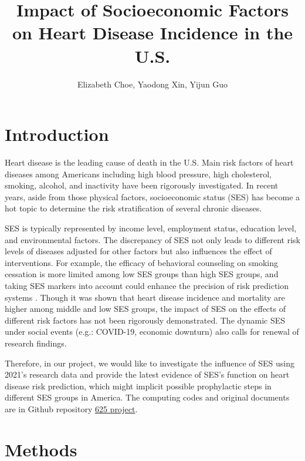 \documentclass[11pt]{article}
\title{Impact of Socioeconomic Factors on Heart Disease Incidence in the U.S.}
\author{Elizabeth Choe, Yaodong Xin, Yijun Guo}
\begin{document}
\maketitle
\section{Introduction}
Heart disease is the leading cause of death in the U.S. Main risk factors of heart diseases among Americans including high blood pressure, high cholesterol, smoking, alcohol, and inactivity have been rigorously investigated. In recent years, aside from those physical factors, socioeconomic status (SES) has become a hot topic to determine the risk stratification of several chronic diseases. 

SES is typically represented by income level, employment status, education level, and environmental factors. The discrepancy of SES not only leads to different risk levels of diseases adjusted for other factors but also influences the effect of interventions. For example, the efficacy of behavioral counseling on smoking cessation is more limited among low SES groups than high SES groups, and taking SES markers into account could enhance the precision of risk prediction systems \citep{1}. Though it was shown that heart disease incidence and mortality are higher among middle and low SES groups, the impact of SES on the effects of different risk factors has not been rigorously demonstrated. The dynamic SES under social events (e.g.: COVID-19, economic downturn) also calls for renewal of research findings.

Therefore, in our project, we would like to investigate the influence of SES using 2021’s research data and provide the latest evidence of SES’s function on heart disease risk prediction, which might implicit possible prophylactic steps in different SES groups in America. The computing codes and original documents are in Github repository \href{https://github.com/elizabethjchoe/biostat625-group5-project}{625 project}.


\section{Methods}
\vspace{-0.2cm}
\end{document}
